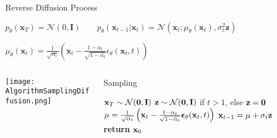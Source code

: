 \begin{frame}{Reverse Diffusion Process}
	
\small
$p_{\theta}(\mathbf{x}_T) = \mathcal{N} (0, \mathbf{I}) \qquad 
p_{\theta}(\mathbf{x}_{t-1} | \mathbf{x}_t) = \mathcal{N}(\mathbf{x}_t; \mu_\theta(\mathbf{x}_t), \sigma_t^2 \mathbf{z})
$
%		
%		

$\mu_\theta(\mathbf{x}_t) = 
\frac{1}{\sqrt{\alpha_{t}}} ( \mathbf{x}_t - 
\frac{1-\alpha_t}{ \sqrt{1 - \bar{\alpha_{t}} }}
\epsilon_{\theta} (\mathbf{x}_t,t))$


\begin{columns}
	\begin{column}{0.43\textwidth}
		\texttt{[image: AlgorithmSamplingDiffusion.png]}
	\end{column}
	
	\begin{column}{0.57\textwidth}
		\footnotesize
		\begin{algorithm}[H]
			\caption{Sampling} \label{alg:sampling}
			\footnotesize
			\begin{algorithmic}[1]
					\footnotesize
					\State $\mathbf{x}_T \sim \mathcal{N}(\mathbf{0}, \mathbf{I})$
					\State $\mathbf{z} \sim \mathcal{N}(\mathbf{0}, \mathbf{I})$ if $t > 1$, else $\mathbf{z} = \mathbf{0}$
					\State $\mu = \frac{1}{\sqrt{\alpha_t}}\left( \mathbf{x}_t - \frac{1-\alpha_t}{\sqrt{1-\bar\alpha_t}} {\boldsymbol{\epsilon}}_\theta(\mathbf{x}_t, t) \right) $
					\State $\mathbf{x}_{t-1} = \mu + \sigma_t \mathbf{z}$
					\EndFor
					\State \textbf{return} $\mathbf{x}_0$
					\vspace{.04in}
				\end{algorithmic}
		\end{algorithm}
\end{column}

\end{columns}

\end{frame}

